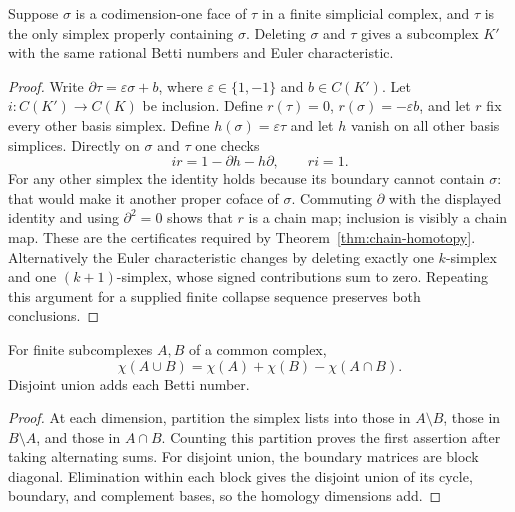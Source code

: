 \begin{proposition}
\label{prop:collapse}
Suppose $\sigma$ is a codimension-one face of $\tau$ in a finite
simplicial complex, and $\tau$ is the only simplex properly containing
$\sigma$.  Deleting $\sigma$ and $\tau$ gives a subcomplex $K'$ with the
same rational Betti numbers and Euler characteristic.
\end{proposition}
\begin{proof}
Write $\partial\tau=\varepsilon\sigma+b$, where
$\varepsilon\in\{1,-1\}$ and $b\in C(K')$.  Let $i:C(K')\to C(K)$ be
inclusion.  Define $r(\tau)=0$, $r(\sigma)=-\varepsilon b$, and let $r$
fix every other basis simplex.  Define $h(\sigma)=\varepsilon\tau$ and
let $h$ vanish on all other basis simplices.  Directly on $\sigma$ and
$\tau$ one checks
\[
 ir=1-\partial h-h\partial,\qquad ri=1.
\]
For any other simplex the identity holds because its boundary cannot
contain $\sigma$: that would make it another proper coface of $\sigma$.
Commuting $\partial$ with the displayed identity and using
$\partial^2=0$ shows that $r$ is a chain map; inclusion is visibly a
chain map.  These are the certificates required by
Theorem~\ref{thm:chain-homotopy}.  Alternatively the Euler characteristic
changes by deleting exactly one $k$-simplex and one $(k+1)$-simplex, whose
signed contributions sum to zero.  Repeating this argument for a supplied
finite collapse sequence preserves both conclusions.
\end{proof}

\begin{proposition}
For finite subcomplexes $A,B$ of a common complex,
\[
 \chi(A\cup B)=\chi(A)+\chi(B)-\chi(A\cap B).
\]
Disjoint union adds each Betti number.
\end{proposition}
\begin{proof}
At each dimension, partition the simplex lists into those in $A\setminus
B$, those in $B\setminus A$, and those in $A\cap B$.  Counting this
partition proves the first assertion after taking alternating sums.  For
disjoint union, the boundary matrices are block diagonal.  Elimination
within each block gives the disjoint union of its cycle, boundary, and
complement bases, so the homology dimensions add.
\end{proof}

